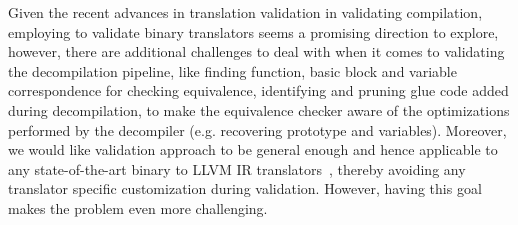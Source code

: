 Given the recent advances in translation validation in validating compilation,
      employing \tv to validate binary translators seems a promising direction to explore, however,
      there are additional challenges to deal with when it comes to validating
      the decompilation pipeline, like finding function, basic block and
      variable correspondence for checking equivalence, identifying and pruning
      glue code added during decompilation, to make the equivalence checker
      aware of the optimizations performed by the decompiler (e.g.  recovering
          prototype and variables). Moreover, we would like validation approach to be
      general enough and hence applicable to any state-of-the-art binary to
      LLVM IR translators~\cite{McSema:Recon14,Remill,FCD,reopt,llvm-mctoll},
      thereby avoiding any translator specific customization during validation.
      However, having this goal makes the problem even more challenging.
      
      
